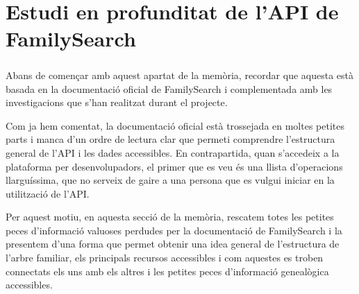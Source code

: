 \chapter{Estudi en profunditat de l'API de FamilySearch}

    \paragraph{}
    Abans de començar amb aquest apartat de la memòria, recordar que aquesta està basada en la documentació oficial de FamilySearch i complementada amb les investigacions que s'han realitzat durant el projecte.

    Com ja hem comentat, la documentació oficial està trossejada en moltes petites parts i manca d'un ordre de lectura clar que permeti comprendre l'estructura general de l'API i les dades accessibles. En contrapartida, quan s'accedeix a la plataforma per desenvolupadors, el primer que es veu és una llista d'operacions llarguíssima, que no serveix de gaire a una persona que es vulgui iniciar en la utilització de l'API.

    Per aquest motiu, en aquesta secció de la memòria, rescatem totes les petites peces d'informació valuoses perdudes per la documentació de FamilySearch i la presentem d'una forma que permet obtenir una idea general de l'estructura de l'arbre familiar, els principals recursos accessibles i com aquestes es troben connectats els uns amb els altres i les petites peces d'informació genealògica accessibles.

    
    
    
    
    
    
    
    
    
    
